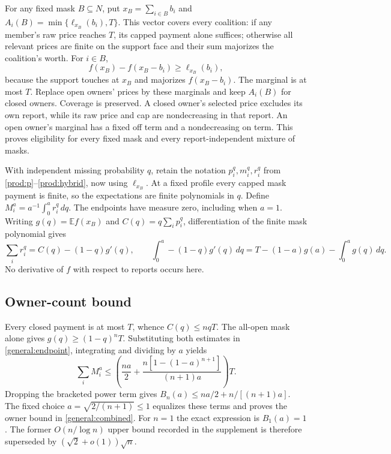\documentclass[11pt]{article}
\theoremstyle{definition}\newtheorem{definition}[theorem]{Definition}
\theoremstyle{remark}\newtheorem{remark}[theorem]{Remark}
\newcommand{\E}{\mathbb E}
\begin{document}
For any fixed mask $B\subseteq N$, put $x_B=\sum_{i\in B}b_i$ and
$A_i(B)=\min\{\ell_{x_B}(b_i),T\}$. This vector covers every coalition:
if any member's raw price reaches $T$, its capped payment alone suffices;
otherwise all relevant prices are finite on the support face and their sum
majorizes the coalition's worth. For $i\in B$,
\[
 f(x_B)-f(x_B-b_i)\ge \ell_{x_B}(b_i),
\]
because the support touches at $x_B$ and majorizes $f(x_B-b_i)$.
The marginal is at most $T$. Replace open owners' prices by these marginals
and keep $A_i(B)$ for closed owners. Coverage is preserved. A closed owner's
selected price excludes its own report, while its raw price and cap are
nondecreasing in that report. An open owner's marginal has a fixed off term
and a nondecreasing on term. This proves eligibility for every fixed mask
and every report-independent mixture of masks.

With independent missing probability $q$, retain the notation $p_i^q,m_i^q,r_i^q$
from \eqref{prod:p}--\eqref{prod:hybrid}, now using $\ell_{x_B}$.
At a fixed profile every capped mask payment is finite, so the expectations
are finite polynomials in $q$. Define $M_i^a=a^{-1}\int_0^a r_i^q\,dq$.
The endpoints have measure zero, including when $a=1$.
Writing $g(q)=\E f(x_B)$ and $C(q)=q\sum_i p_i^q$, differentiation of the
finite mask polynomial gives
\begin{equation}\label{general:endpoint}
 \sum_i r_i^q=C(q)-(1-q)g'(q),\qquad
 \int_0^a-(1-q)g'(q)\,dq
 =T-(1-a)g(a)-\int_0^a g(q)\,dq.
\end{equation}
No derivative of $f$ with respect to reports occurs here.

\subsection{Owner-count bound}
Every closed payment is at most $T$, whence $C(q)\le nqT$.
The all-open mask alone gives $g(q)\ge(1-q)^nT$.
Substituting both estimates in \eqref{general:endpoint}, integrating and
dividing by $a$ yields
\[
 \sum_i M_i^a\le\left(\frac{na}{2}+
 \frac{n[1-(1-a)^{n+1}]}{(n+1)a}\right)T.
\]
Dropping the bracketed power term gives
$B_n(a)\le na/2+n/[(n+1)a]$. The fixed choice
$a=\sqrt{2/(n+1)}\le1$ equalizes these terms and proves the owner bound
in \eqref{general:combined}. For $n=1$ the exact expression is $B_1(a)=1$.
The former $O(n/\log n)$ upper bound recorded in the supplement is therefore
superseded by $(\sqrt2+o(1))\sqrt n$.
\end{document}
